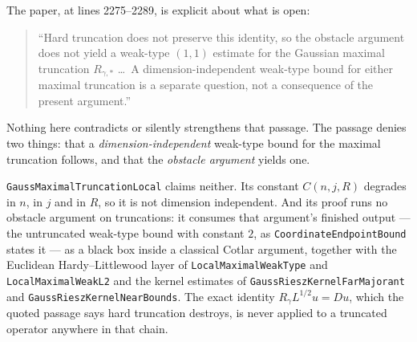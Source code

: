 The paper, at lines 2275--2289, is explicit about what is open:
\begin{quote}
``Hard truncation does not preserve this identity, so the obstacle argument
does not yield a weak-type $(1,1)$ estimate for the Gaussian maximal truncation
$R_{\gamma,*}$ \dots\ A dimension-independent weak-type bound for either maximal
truncation is a separate question, not a consequence of the present argument.''
\end{quote}
Nothing here contradicts or silently strengthens that passage.  The passage
denies two things: that a \emph{dimension-independent} weak-type bound for the
maximal truncation follows, and that the \emph{obstacle argument} yields one.

\texttt{GaussMaximalTruncationLocal} claims neither.  Its constant
$C(n,j,R)$ degrades in $n$, in $j$ and in $R$, so it is not dimension
independent.  And its proof runs no obstacle argument on truncations: it
consumes that argument's finished output --- the untruncated weak-type bound
with constant $2$, as \texttt{CoordinateEndpointBound} states it --- as a black
box inside a classical Cotlar argument, together with the Euclidean
Hardy--Littlewood layer of \texttt{LocalMaximalWeakType} and
\texttt{LocalMaximalWeakL2} and the kernel estimates of
\texttt{GaussRieszKernelFarMajorant} and \texttt{GaussRieszKernelNearBounds}.
The exact identity $R_\gamma L^{1/2}u = Du$, which the quoted passage says hard
truncation destroys, is never applied to a truncated operator anywhere in that
chain.
